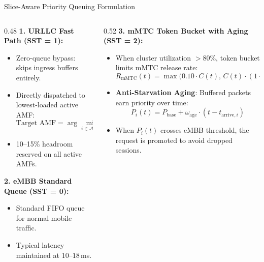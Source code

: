 \documentclass[aspectratio=169,10pt]{beamer}
\begin{document}
\begin{frame}{Slice-Aware Priority Queuing Formulation}
    \begin{columns}[T]
        \begin{column}{0.48\textwidth}
            \textbf{1. URLLC Fast Path (SST = 1):}
            \begin{itemize}
                \item Zero-queue bypass: skips ingress buffers entirely.
                \item Directly dispatched to lowest-loaded active AMF:
                $$\text{Target AMF} = \arg\min_{i \in \mathcal{A}_{\text{active}}} \text{CPU}_i(t)$$
                \item 10--15\% headroom reserved on all active AMFs.
            \end{itemize}
            \vspace{0.2cm}
            \textbf{2. eMBB Standard Queue (SST = 0):}
            \begin{itemize}
                \item Standard FIFO queue for normal mobile traffic.
                \item Typical latency maintained at $10$--$18$\,ms.
            \end{itemize}
        \end{column}
        \begin{column}{0.52\textwidth}
            \textbf{3. mMTC Token Bucket with Aging (SST = 2):}
            \begin{itemize}
                \item When cluster utilization $> 80\%$, token bucket limits mMTC release rate:
                $$R_{\text{mMTC}}(t) = \max\Big(0.10 \cdot C(t), \, C(t) \cdot (1 - \text{CPU}(t))\Big)$$
                \item \textbf{Anti-Starvation Aging}: Buffered packets earn priority over time:
                $$P_i(t) = P_{\text{base}} + \omega_{\text{age}} \cdot (t - t_{\text{arrive}, i})$$
                \item When $P_i(t)$ crosses eMBB threshold, the request is promoted to avoid dropped sessions.
            \end{itemize}
        \end{column}
    \end{columns}
\end{frame}
\end{document}
